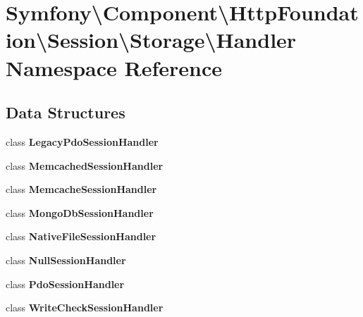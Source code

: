 \section{Symfony\textbackslash{}Component\textbackslash{}Http\+Foundation\textbackslash{}Session\textbackslash{}Storage\textbackslash{}Handler Namespace Reference}
\label{namespace_symfony_1_1_component_1_1_http_foundation_1_1_session_1_1_storage_1_1_handler}
\subsection*{Data Structures}
\begin{DoxyCompactItemize}
\item 
class {\bf Legacy\+Pdo\+Session\+Handler}
\item 
class {\bf Memcached\+Session\+Handler}
\item 
class {\bf Memcache\+Session\+Handler}
\item 
class {\bf Mongo\+Db\+Session\+Handler}
\item 
class {\bf Native\+File\+Session\+Handler}
\item 
class {\bf Null\+Session\+Handler}
\item 
class {\bf Pdo\+Session\+Handler}
\item 
class {\bf Write\+Check\+Session\+Handler}
\end{DoxyCompactItemize}
